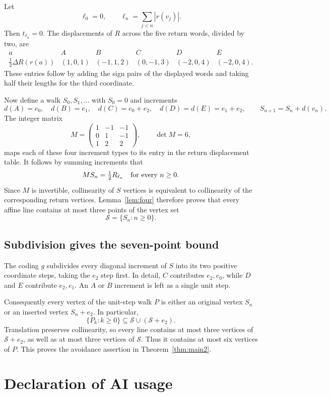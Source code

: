 \documentclass[12pt,reqno]{article}
\begin{document}
Let
\[
 \ell_0=0,\qquad \ell_n=\sum_{j<n}|r(v_j)|.
\]
Then $t_{\ell_n}=0$. The displacements of $R$ across the five return
words, divided by two, are
\[
\begin{array}{c|ccccc}
 a&A&B&C&D&E\\\hline
 \tfrac12\Delta R(r(a))
 &(1,0,1)&(-1,1,2)&(0,-1,3)&(-2,0,4)&(-2,0,4).
\end{array}
\]
These entries follow by adding the sign pairs of the displayed words
and taking half their lengths for the third coordinate.

Now define a walk $S_0,S_1,\ldots$ with $S_0=0$ and increments
\[
 d(A)=e_0,\quad d(B)=e_1,\quad
 d(C)=e_0+e_2,\quad d(D)=d(E)=e_1+e_2,
 \qquad S_{n+1}=S_n+d(v_n).
\]
The integer matrix
\[
 M=\begin{pmatrix}1&-1&-1\\0&1&-1\\1&2&2\end{pmatrix},
 \qquad \det M=6,
\]
maps each of these four increment types to its entry in the return
displacement table. It follows by summing increments that
\[
 MS_n=\tfrac12 R_{\ell_n}\quad\hbox{for every }n\geq0.
\]
Since $M$ is invertible, collinearity of $S$ vertices is equivalent to
collinearity of the corresponding return vertices. Lemma~\ref{lem:four}
therefore proves that every affine line contains at most three points
of the vertex set
\[
 \mathcal S=\{S_n:n\geq0\}.
\]

\subsection{Subdivision gives the seven-point bound}

The coding $g$ subdivides every diagonal increment of $S$ into its two
positive coordinate steps, taking the $e_2$ step first. In detail,
$C$ contributes $e_2,e_0$, while $D$ and $E$ contribute $e_2,e_1$.
An $A$ or $B$ increment is left as a single unit step.

Consequently every vertex of the unit-step walk $P$ is either an
original vertex $S_n$ or an inserted vertex $S_n+e_2$. In particular,
\[
 \{P_k:k\geq0\}\subseteq \mathcal S\cup(\mathcal S+e_2).
\]
Translation preserves collinearity, so every line contains at most
three vertices of $\mathcal S+e_2$, as well as at most three vertices
of $\mathcal S$. Thus it contains at most six vertices of $P$.
This proves the avoidance assertion in Theorem~\ref{thm:main2}.

\section{Declaration of AI usage}
\end{document}
